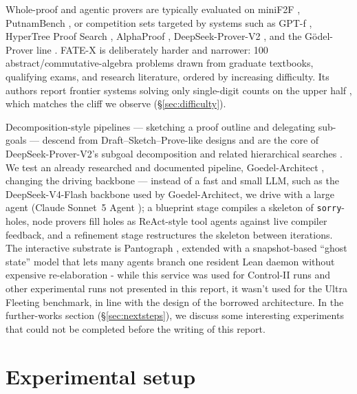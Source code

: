 \documentclass[12pt, a4paper]{article}
\begin{document}
Whole-proof and agentic provers are typically evaluated on miniF2F
\cite{zheng2022minif2f}, PutnamBench \cite{tsoukalas2024putnambench}, or
competition sets targeted by systems such as GPT-f \cite{polu2020gptf},
HyperTree Proof Search \cite{lample2022hypertree}, AlphaProof
\cite{alphaproof2024}, DeepSeek-Prover-V2 \cite{deepseekproverv2}, and the
G\"odel-Prover line \cite{davis2025goedelspoetry}. FATE-X \cite{fatex2025}
is deliberately harder and narrower: 100 abstract/commutative-algebra problems
drawn from graduate textbooks, qualifying exams, and research literature,
ordered by increasing difficulty. Its authors report frontier systems solving
only single-digit counts on the upper half \cite{benchmarklist_fatex}, which
matches the cliff we observe (\S\ref{sec:difficulty}).

Decomposition-style pipelines --- sketching a proof outline and delegating
sub-goals --- descend from Draft--Sketch--Prove-like designs and are the core of
DeepSeek-Prover-V2's subgoal decomposition \cite{deepseekproverv2} and related
hierarchical searches \cite{lample2022hypertree,decomposition_openreview}. We test an already
researched and documented pipeline, Goedel-Architect \cite{goedelarchitect}, changing the driving
backbone --- instead of a fast and small LLM, such as the DeepSeek-V4-Flash backbone used by
Goedel-Architect, we drive with a large agent (Claude Sonnet~5 Agent \cite{anthropic2026sonnet5});
a blueprint stage compiles a
skeleton of \texttt{sorry}-holes, node provers fill holes as ReAct-style tool
agents \cite{yao2023react} against live compiler feedback, and a refinement
stage restructures the skeleton between iterations. The interactive substrate
is Pantograph \cite{aniva2024pantograph,pypantograph}, extended with a
snapshot-based ``ghost state'' model \cite{shen2026snapshot,leakii2026upgrade}
that lets many agents branch one resident Lean daemon without expensive re-elaboration - while 
this service was used for Control-II runs and other experimental runs not presented in this report, 
it wasn't used for the Ultra Fleeting benchmark, in line with the design of
the borrowed architecture. In the further-works section (\S\ref{sec:nextsteps}), we discuss some
interesting experiments that could not be completed before the writing of this report.

\section{Experimental setup}
\end{document}
